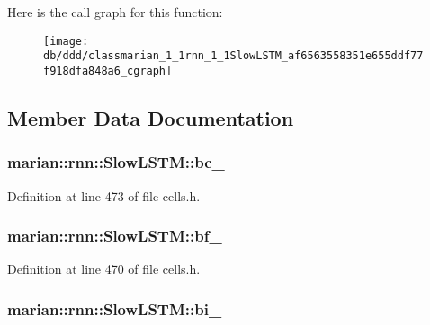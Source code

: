 Here is the call graph for this function\+:
\nopagebreak
\begin{figure}[H]
\begin{center}
\leavevmode
\texttt{[image: db/ddd/classmarian\_1\_1rnn\_1\_1SlowLSTM\_af6563558351e655ddf77f918dfa848a6\_cgraph]}
\end{center}
\end{figure}




\subsection{Member Data Documentation}
\subsubsection[{\texorpdfstring{bc\+\_\+}{bc_}}]{ marian\+::rnn\+::\+Slow\+L\+S\+T\+M\+::bc\+\_\+\hspace{0.3cm}{\ttfamily [private]}}\hypertarget{classmarian_1_1rnn_1_1SlowLSTM_a0dd1a8eb2dd6fbcbd5c654e8be3cb235}{}\label{classmarian_1_1rnn_1_1SlowLSTM_a0dd1a8eb2dd6fbcbd5c654e8be3cb235}


Definition at line 473 of file cells.\+h.

\subsubsection[{\texorpdfstring{bf\+\_\+}{bf_}}]{ marian\+::rnn\+::\+Slow\+L\+S\+T\+M\+::bf\+\_\+\hspace{0.3cm}{\ttfamily [private]}}\hypertarget{classmarian_1_1rnn_1_1SlowLSTM_adfbbbcf3b013ff5148f7d4e2b60a4470}{}\label{classmarian_1_1rnn_1_1SlowLSTM_adfbbbcf3b013ff5148f7d4e2b60a4470}


Definition at line 470 of file cells.\+h.

\subsubsection[{\texorpdfstring{bi\+\_\+}{bi_}}]{ marian\+::rnn\+::\+Slow\+L\+S\+T\+M\+::bi\+\_\+\hspace{0.3cm}{\ttfamily [private]}}\hypertarget{classmarian_1_1rnn_1_1SlowLSTM_a5ebe38db6d1d6096814eb58d24d92059}{}\label{classmarian_1_1rnn_1_1SlowLSTM_a5ebe38db6d1d6096814eb58d24d92059}


